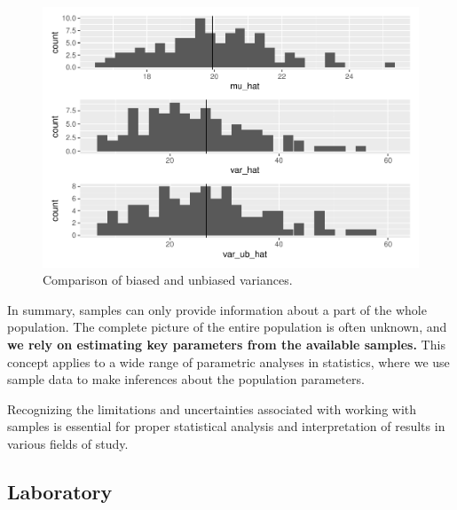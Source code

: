 \documentclass[
]{article}
\begin{document}
\begin{figure}

{\centering \includegraphics{biostats_files/figure-latex/var-ub-1} 

}

\caption{Comparison of biased and unbiased variances.}\label{fig:var-ub}
\end{figure}

In summary, samples can only provide information about a part of the whole population. The complete picture of the entire population is often unknown, and \textbf{we rely on estimating key parameters from the available samples.} This concept applies to a wide range of parametric analyses in statistics, where we use sample data to make inferences about the population parameters.

Recognizing the limitations and uncertainties associated with working with samples is essential for proper statistical analysis and interpretation of results in various fields of study.

\hypertarget{laboratory-1}{%
\subsection{Laboratory}\label{laboratory-1}}
\end{document}
